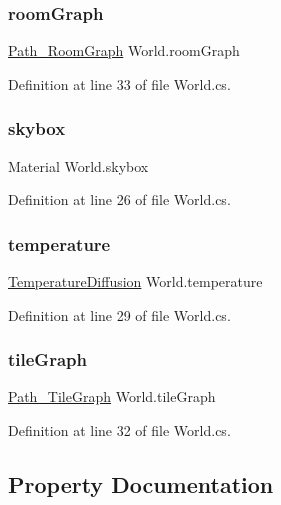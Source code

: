 \subsubsection{\texorpdfstring{room\+Graph}{roomGraph}}
{\footnotesize\ttfamily \hyperlink{class_path___room_graph}{Path\+\_\+\+Room\+Graph} World.\+room\+Graph}



Definition at line 33 of file World.\+cs.

\mbox{\label{class_world_a12947be82424650dfae7fccc0a475f4c}} 
\subsubsection{\texorpdfstring{skybox}{skybox}}
{\footnotesize\ttfamily Material World.\+skybox}



Definition at line 26 of file World.\+cs.

\mbox{\label{class_world_afb73b4c36ddaf9eaf79807b0d3b0e012}} 
\subsubsection{\texorpdfstring{temperature}{temperature}}
{\footnotesize\ttfamily \hyperlink{class_temperature_diffusion}{Temperature\+Diffusion} World.\+temperature}



Definition at line 29 of file World.\+cs.

\mbox{\label{class_world_a68088a0e3057902e6110cc52c0ca4c47}} 
\subsubsection{\texorpdfstring{tile\+Graph}{tileGraph}}
{\footnotesize\ttfamily \hyperlink{class_path___tile_graph}{Path\+\_\+\+Tile\+Graph} World.\+tile\+Graph}



Definition at line 32 of file World.\+cs.



\subsection{Property Documentation}
\mbox{\label{class_world_ac0dc8730938f32a2e69ad943a71cb34d}} 
